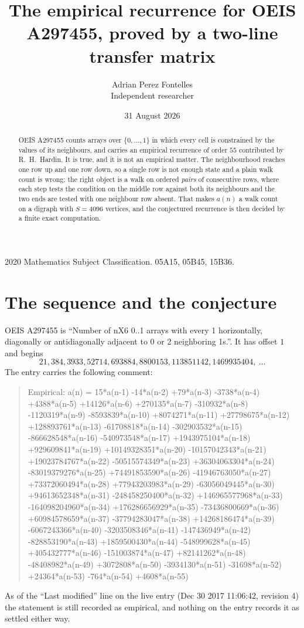 \documentclass[11pt,a4paper]{article}
\title{The empirical recurrence for OEIS A297455, proved by a two-line transfer matrix}
\author{Adrian Perez Fontelles\\ \small Independent researcher}
\date{31 August 2026}
\theoremstyle{plain}
\theoremstyle{definition}
\begin{document}
\maketitle

\begin{abstract}
OEIS A297455 counts arrays over $\{0,\dots,1\}$ in which every cell is constrained by the
values of its neighbours, and carries an empirical recurrence of order $55$ contributed
by R.~H.~Hardin. It is true, and it is not an empirical matter. The neighbourhood reaches one
row up and one row down, so a single row is not enough state and a plain walk count
is wrong; the right object is a walk on ordered \emph{pairs} of consecutive rows, where
each step tests the condition on the middle row against both its neighbours and the two
ends are tested with one neighbour row absent. That makes $a(n)$ a walk count on a digraph
with $S=4096$ vertices, and the conjectured recurrence is then decided by a finite exact
computation.
\end{abstract}

\noindent\small 2020 Mathematics Subject Classification. 05A15, 05B45, 15B36.\normalsize

\section{The sequence and the conjecture}

OEIS A297455 is ``Number of nX6 0..1 arrays with every 1 horizontally, diagonally or antidiagonally adjacent to 0 or 2 neighboring 1s.''. It has offset $1$ and begins
\[
21, 384, 3933, 52714, 693884, 8800153, 113851142, 1469935404,\ \dots
\]
The entry carries the following comment:
\begin{quote}\small
Empirical: a(n) = 15*a(n-1) -14*a(n-2) +79*a(n-3) -3738*a(n-4) +4388*a(n-5) +14126*a(n-6) +270135*a(n-7) -310932*a(n-8) -1120319*a(n-9) -8593839*a(n-10) +8074271*a(n-11) +27798675*a(n-12) +128893761*a(n-13) -61708818*a(n-14) -302903532*a(n-15) -866628548*a(n-16) -540973548*a(n-17) +1943975104*a(n-18) +929609841*a(n-19) +10149328351*a(n-20) -10157042343*a(n-21) +19023784767*a(n-22) -50515574349*a(n-23) +36304063304*a(n-24) -83019379276*a(n-25) +74491853590*a(n-26) -41946763050*a(n-27) +73372060494*a(n-28) +77943203983*a(n-29) -63056049445*a(n-30) +94613652348*a(n-31) -248458250400*a(n-32) +146965577968*a(n-33) -164098204960*a(n-34) +176286656929*a(n-35) -73436800669*a(n-36) +60984578659*a(n-37) -37794283047*a(n-38) +14268186474*a(n-39) -6067243366*a(n-40) -3203508346*a(n-41) -147436949*a(n-42) -828853190*a(n-43) +1859500430*a(n-44) -548999628*a(n-45) +405432777*a(n-46) -151003874*a(n-47) +82141262*a(n-48) -48408982*a(n-49) +3072808*a(n-50) -3934130*a(n-51) -31698*a(n-52) +24364*a(n-53) -764*a(n-54) +4608*a(n-55)
\end{quote}
As of the ``Last modified'' line on the live entry (Dec 30 2017 11:06:42, revision 4) the statement is
still recorded as empirical, and nothing on the entry records it as settled either way.
\end{document}
